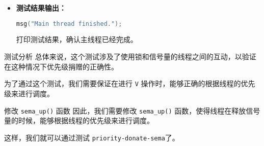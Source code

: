 \documentclass{beamer}
\begin{document}
\begin{frame}
\begin{itemize}
    \item \textbf{测试结果输出：}
          \begin{lstlisting}[language=C]
    msg("Main thread finished.");
\end{lstlisting}
          打印测试结果，确认主线程已经完成。

  \end{itemize}

  \framebreak

  \begin{block}{测试分析}
    总体来说，这个测试涉及了使用锁和信号量的线程之间的互动，以验证在这种情况下优先级捐赠的正确性。

    \vspace{1em}

    为了通过这个测试，我们需要保证在进行 \texttt{V} 操作时，能够正确的根据线程的优先级来进行调度。
  \end{block}

  \framebreak

  \begin{block}{修改 \texttt{sema\_up()} 函数}
    因此，我们需要修改 \texttt{sema\_up()} 函数，使得线程在释放信号量的时候，能够根据线程的优先级来进行调度。
  \end{block}

    
    

  \framebreak

  这样，我们就可以通过测试 \texttt{priority-donate-sema}了。

\end{frame}
\end{document}

